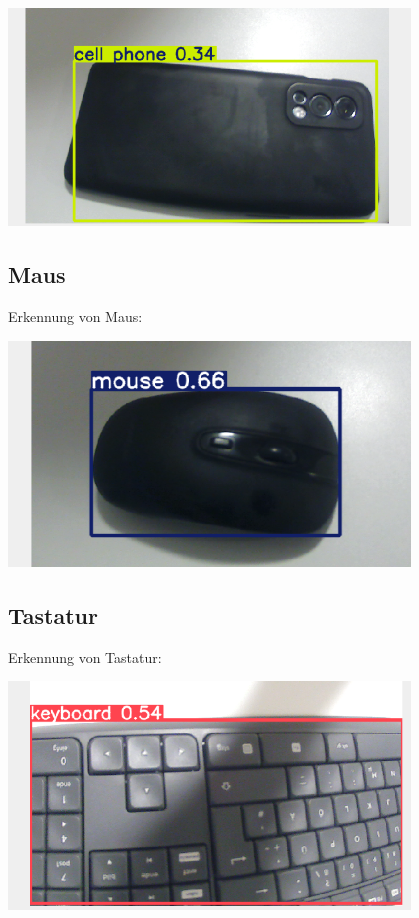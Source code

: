 \documentclass{article}
\begin{document}
\begin{center}
    \includegraphics[width=0.8\textwidth]{Bilder/handyErkennung.png}
\end{center}

\subsection{Maus}
Erkennung von Maus:

\begin{center}
    \includegraphics[width=0.8\textwidth]{Bilder/mausErkennung.png}
\end{center}

\subsection{Tastatur}
Erkennung von Tastatur: 

\begin{center}
    \includegraphics[width=0.8\textwidth]{Bilder/tastaturErkennung.png}
\end{center}
\end{document}
